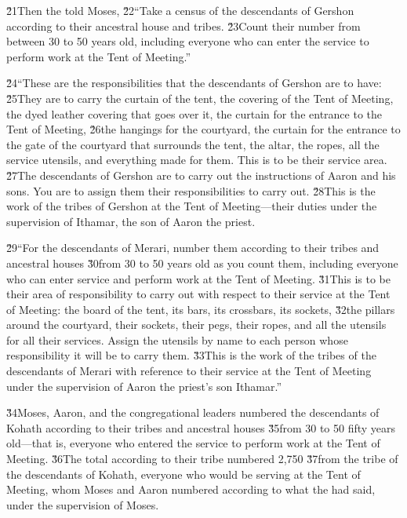 \v{21}Then the  told Moses, \v{22}``Take a census of the descendants of Gershon according to their ancestral house and tribes. \v{23}Count their number from between 30 to 50 years old, including everyone who can enter the service to perform work at the Tent of Meeting.''

\v{24}``These are the responsibilities that the descendants of Gershon are to have: \v{25}They are to carry the curtain of the tent, the covering of the Tent of Meeting, the dyed leather covering that goes over it, the curtain for the entrance to the Tent of Meeting, \v{26}the hangings for the courtyard, the curtain for the entrance to the gate of the courtyard that surrounds the tent, the altar, the ropes, all the service utensils, and everything made for them. This is to be their service area. \v{27}The descendants of Gershon are to carry out the instructions of Aaron and his sons. You are to assign them their responsibilities to carry out. \v{28}This is the work of the tribes of Gershon at the Tent of Meeting---their duties under the supervision of Ithamar, the son of Aaron the priest.

\v{29}``For the descendants of Merari, number them according to their tribes and ancestral houses \v{30}from 30 to 50 years old as you count them, including everyone who can enter service and perform work at the Tent of Meeting. \v{31}This is to be their area of responsibility to carry out with respect to their service at the Tent of Meeting: the board of the tent, its bars, its crossbars, its sockets, \v{32}the pillars around the courtyard, their sockets, their pegs, their ropes, and all the utensils for all their services. Assign the utensils by name to each person whose responsibility it will be to carry them. \v{33}This is the work of the tribes of the descendants of Merari with reference to their service at the Tent of Meeting under the supervision of Aaron the priest's son Ithamar.''

\v{34}Moses, Aaron, and the congregational leaders numbered the descendants of Kohath according to their tribes and ancestral houses \v{35}from 30 to 50 fifty years old---that is, everyone who entered the service to perform work at the Tent of Meeting. \v{36}The total according to their tribe numbered 2,750 \v{37}from the tribe of the descendants of Kohath, everyone who would be serving at the Tent of Meeting, whom Moses and Aaron numbered according to what the  had said, under the supervision of Moses.

